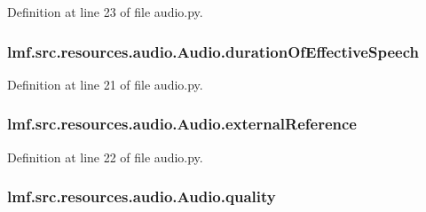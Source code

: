 Definition at line 23 of file audio.\+py.

\hypertarget{classlmf_1_1src_1_1resources_1_1audio_1_1_audio_ad1640839eb1c58ca5ef9796eb7c0f559}{
\subsubsection[{duration\+Of\+Effective\+Speech}]{\setlength{\rightskip}{0pt plus 5cm}lmf.\+src.\+resources.\+audio.\+Audio.\+duration\+Of\+Effective\+Speech}}\label{classlmf_1_1src_1_1resources_1_1audio_1_1_audio_ad1640839eb1c58ca5ef9796eb7c0f559}


Definition at line 21 of file audio.\+py.

\hypertarget{classlmf_1_1src_1_1resources_1_1audio_1_1_audio_acedec7cf6764d262298924f7deb0841a}{
\subsubsection[{external\+Reference}]{\setlength{\rightskip}{0pt plus 5cm}lmf.\+src.\+resources.\+audio.\+Audio.\+external\+Reference}}\label{classlmf_1_1src_1_1resources_1_1audio_1_1_audio_acedec7cf6764d262298924f7deb0841a}


Definition at line 22 of file audio.\+py.

\hypertarget{classlmf_1_1src_1_1resources_1_1audio_1_1_audio_a7ece3b242eefb9b0da1f5cac2a5a0859}{
\subsubsection[{quality}]{\setlength{\rightskip}{0pt plus 5cm}lmf.\+src.\+resources.\+audio.\+Audio.\+quality}}\label{classlmf_1_1src_1_1resources_1_1audio_1_1_audio_a7ece3b242eefb9b0da1f5cac2a5a0859}


